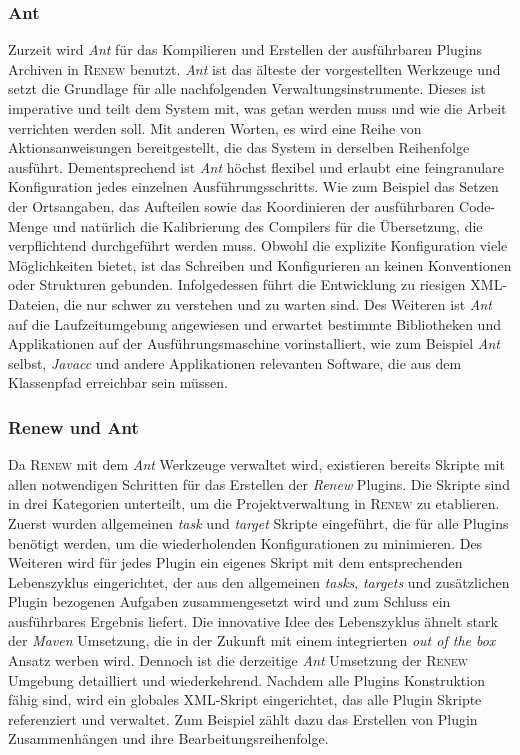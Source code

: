 		\subsubsection{Ant}	%
		Zurzeit wird \textit{Ant} für das Kompilieren und Erstellen der ausführbaren Plugins Archiven in \textsc{Renew} benutzt. \textit{Ant} ist das älteste der vorgestellten Werkzeuge und setzt die Grundlage für alle nachfolgenden Verwaltungsinstrumente. Dieses ist imperative und teilt dem System mit, was getan werden muss und wie die Arbeit verrichten werden soll. Mit anderen Worten, es wird eine Reihe von Aktionsanweisungen bereitgestellt, die das System in derselben Reihenfolge ausführt. Dementsprechend ist \textit{Ant} höchst flexibel und erlaubt eine feingranulare Konfiguration jedes einzelnen Ausführungsschritts. Wie zum Beispiel das Setzen der Ortsangaben, das Aufteilen sowie das Koordinieren der ausführbaren Code-Menge und natürlich die Kalibrierung des Compilers für die Übersetzung, die verpflichtend durchgeführt werden muss.\newline 
		Obwohl die explizite Konfiguration viele Möglichkeiten bietet, ist das Schreiben und Konfigurieren an keinen Konventionen oder Strukturen gebunden. Infolgedessen führt die Entwicklung zu riesigen XML-Dateien, die nur schwer zu verstehen und zu warten sind. Des Weiteren ist \textit{Ant} auf die Laufzeitumgebung angewiesen und erwartet bestimmte Bibliotheken und Applikationen auf der Ausführungsmaschine vorinstalliert, wie zum Beispiel \textit{Ant} selbst, \textit{Javacc} und andere Applikationen relevanten Software, die aus dem Klassenpfad erreichbar sein müssen. 

		\subsubsection{Renew und Ant} %
		Da \textsc{Renew} mit dem \textit{Ant} Werkzeuge verwaltet wird, existieren bereits Skripte mit allen notwendigen Schritten für das Erstellen der \textit{Renew} Plugins. Die Skripte sind in drei Kategorien unterteilt, um die Projektverwaltung in \textsc{Renew} zu etablieren. Zuerst wurden allgemeinen \textit{task} und \textit{target} Skripte eingeführt, die für alle Plugins benötigt werden, um die wiederholenden Konfigurationen zu minimieren. Des Weiteren wird für jedes Plugin ein eigenes Skript mit dem entsprechenden Lebenszyklus eingerichtet, der aus den allgemeinen \textit{tasks}, \textit{targets} und zusätzlichen Plugin bezogenen Aufgaben zusammengesetzt wird und zum Schluss ein ausführbares Ergebnis liefert. Die innovative Idee des Lebenszyklus ähnelt stark der \textit{Maven} Umsetzung, die in der Zukunft mit einem integrierten \textit{out of the box} Ansatz werben wird. Dennoch ist die derzeitige \textit{Ant} Umsetzung der \textsc{Renew} Umgebung detailliert und wiederkehrend. \newline
		Nachdem alle Plugins Konstruktion fähig sind, wird ein globales XML-Skript eingerichtet, das alle Plugin Skripte referenziert und verwaltet. Zum Beispiel zählt dazu das Erstellen von Plugin Zusammenhängen und ihre Bearbeitungsreihenfolge.
		

